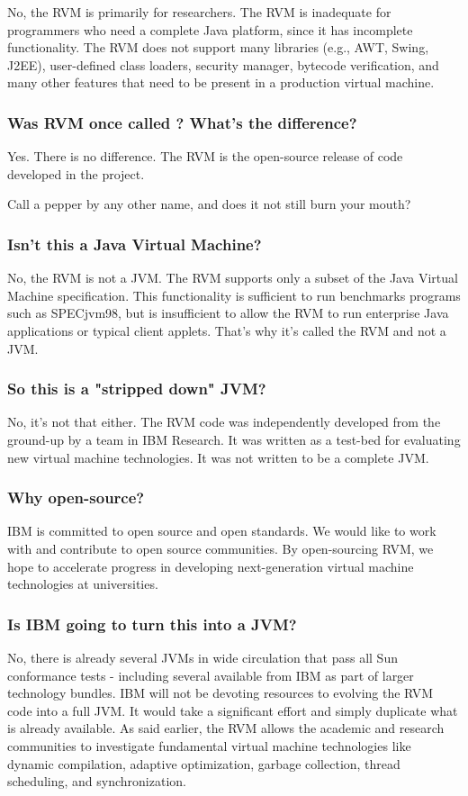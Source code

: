 No, the RVM is primarily for researchers.  The RVM is inadequate
for programmers who need a complete Java platform, since it has
incomplete functionality.  The RVM does not support many libraries
(e.g., AWT, Swing, J2EE), user-defined class loaders, security
manager, bytecode verification, and many other features that need to
be present in a production virtual machine.

\subsubsection{Was RVM once called \jp? What's the difference?}

Yes. There is no difference.  The RVM is the open-source release of
code developed in the \jp project.

Call a pepper by any other name, and does it
not still burn your mouth?


\subsubsection{Isn't this a Java Virtual Machine?}
No, the RVM is not a JVM. The RVM supports only a subset of the
Java Virtual Machine specification. This functionality is sufficient
to run benchmarks programs such as SPECjvm98, but is insufficient to
allow the RVM to run enterprise Java applications or typical client
applets. That's why it's called the RVM and not a JVM.

\subsubsection{So this is a "stripped down" JVM?}
No, it's not that either. The RVM code was independently developed
from the ground-up by a team in IBM Research.  It was written as a
test-bed for evaluating new virtual machine technologies. It was not
written to be a complete JVM.


\subsubsection{Why open-source?}
IBM is committed to open source and open standards.  We would like
to work with and contribute to open source communities.  By
open-sourcing RVM, we hope to accelerate progress in developing
next-generation virtual machine technologies at universities.

\subsubsection{Is IBM going to turn this into a JVM?}
No, there is already several JVMs in wide circulation that pass
all Sun conformance tests - including several available from IBM as
part of larger technology bundles. IBM will not be devoting resources
to evolving the RVM code into a full JVM. It would take a significant
effort and simply duplicate what is already available. As said
earlier, the RVM allows the academic and research communities to
investigate fundamental virtual machine technologies like dynamic
compilation, adaptive optimization, garbage collection, thread
scheduling, and synchronization.

